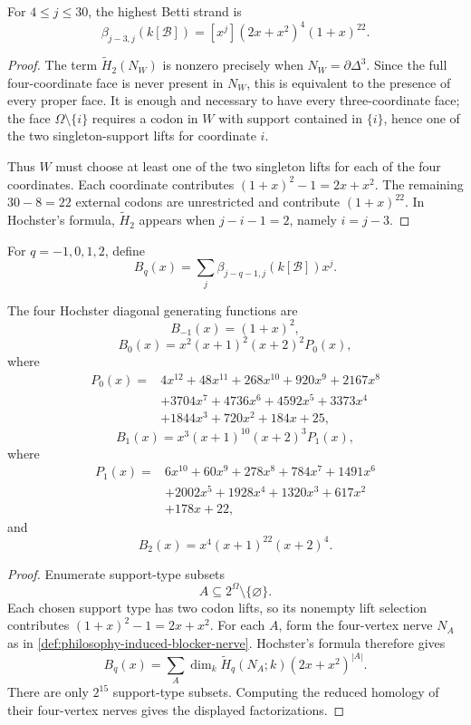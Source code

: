 \begin{theorem}
\label{thm:philosophy-top-betti-strand}
For $4\leq j\leq30$, the highest Betti strand is
$$
  \beta_{j-3,j}(k[\mathcal{B}])
  =
  [x^{j}](2x+x^{2})^{4}(1+x)^{22}.
$$
\end{theorem}
\begin{proof}
The term $\widetilde{H}_{2}(N_{W})$ is nonzero precisely when
$N_{W}=\partial\Delta^{3}$. Since the full four-coordinate face is
never present in $N_{W}$, this is equivalent to the presence of every
proper face. It is enough and necessary to have every three-coordinate
face; the face $\Omega\setminus\{i\}$ requires a codon in $W$ with
support contained in $\{i\}$, hence one of the two singleton-support
lifts for coordinate $i$.

Thus $W$ must choose at least one of the two singleton lifts for each
of the four coordinates. Each coordinate contributes
$(1+x)^{2}-1=2x+x^{2}$. The remaining $30-8=22$ external codons are
unrestricted and contribute $(1+x)^{22}$. In Hochster's formula,
$\widetilde{H}_{2}$ appears when $j-i-1=2$, namely $i=j-3$.
\end{proof}

\begin{definition}
\label{def:philosophy-hochster-diagonal-series}
For $q=-1,0,1,2$, define
$$
  B_{q}(x)
  =
  \sum_{j}\beta_{j-q-1,j}(k[\mathcal{B}])x^{j}.
$$
\end{definition}

\begin{theorem}
\label{thm:philosophy-complete-hochster-diagonal-series}
The four Hochster diagonal generating functions are
$$
  B_{-1}(x)=(1+x)^{2},
$$
$$
  B_{0}(x)=x^{2}(x+1)^{2}(x+2)^{2}P_{0}(x),
$$
where
$$
\begin{aligned}
  P_{0}(x)=&
  4x^{12}+48x^{11}+268x^{10}+920x^{9}+2167x^{8}\\
  &+3704x^{7}+4736x^{6}+4592x^{5}+3373x^{4}\\
  &+1844x^{3}+720x^{2}+184x+25,
\end{aligned}
$$
$$
  B_{1}(x)=x^{3}(x+1)^{10}(x+2)^{3}P_{1}(x),
$$
where
$$
\begin{aligned}
  P_{1}(x)=&
  6x^{10}+60x^{9}+278x^{8}+784x^{7}+1491x^{6}\\
  &+2002x^{5}+1928x^{4}+1320x^{3}+617x^{2}\\
  &+178x+22,
\end{aligned}
$$
and
$$
  B_{2}(x)=x^{4}(x+1)^{22}(x+2)^{4}.
$$
\end{theorem}
\begin{proof}
Enumerate support-type subsets
$$
  A\subseteq 2^{\Omega}\setminus\{\varnothing\}.
$$
Each chosen support type has two codon lifts, so its nonempty lift
selection contributes $(1+x)^{2}-1=2x+x^{2}$. For each $A$, form the
four-vertex nerve $N_{A}$ as in
\autoref{def:philosophy-induced-blocker-nerve}. Hochster's formula
therefore gives
$$
  B_{q}(x)
  =
  \sum_{A}
  \dim_{k}\widetilde{H}_{q}(N_{A};k)
  (2x+x^{2})^{|A|}.
$$
There are only $2^{15}$ support-type subsets. Computing the reduced
homology of their four-vertex nerves gives the displayed factorizations.
\end{proof}

